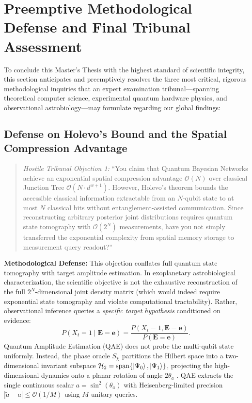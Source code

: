 \section{Preemptive Methodological Defense and Final Tribunal Assessment}\label{sec:preemptive_defense_ch5}

To conclude this Master's Thesis with the highest standard of scientific integrity, this section anticipates and preemptively resolves the three most critical, rigorous methodological inquiries that an expert examination tribunal—spanning theoretical computer science, experimental quantum hardware physics, and observational astrobiology—may formulate regarding our global findings:

\subsection{Defense on Holevo's Bound and the Spatial Compression Advantage}
\begin{quote}
\emph{Hostile Tribunal Objection 1:} ``You claim that Quantum Bayesian Networks achieve an exponential spatial compression advantage $\mathcal{O}(N)$ over classical Junction Tree $\mathcal{O}(N \cdot d^{w+1})$. However, Holevo's theorem bounds the accessible classical information extractable from an $N$-qubit state to at most $N$ classical bits without entanglement-assisted communication. Since reconstructing arbitrary posterior joint distributions requires quantum state tomography with $\mathcal{O}(2^N)$ measurements, have you not simply transferred the exponential complexity from spatial memory storage to measurement query readout?''
\end{quote}
\textbf{Methodological Defense:} This objection conflates full quantum state tomography with target amplitude estimation. In exoplanetary astrobiological characterization, the scientific objective is not the exhaustive reconstruction of the full $2^N$-dimensional joint density matrix (which would indeed require exponential state tomography and violate computational tractability). Rather, observational inference queries a \emph{specific target hypothesis} conditioned on evidence:
\begin{equation}
P(X_t = 1 \mid \mathbf{E} = \mathbf{e}) = \frac{P(X_t = 1, \mathbf{E} = \mathbf{e})}{P(\mathbf{E} = \mathbf{e})}.
\end{equation}
Quantum Amplitude Estimation (QAE) does not probe the multi-qubit state uniformly. Instead, the phase oracle $S_\chi$ partitions the Hilbert space into a two-dimensional invariant subspace $\mathcal{H}_2 = \mathrm{span}\{\left|\Psi_0\right\rangle, \left|\Psi_1\right\rangle\}$, projecting the high-dimensional dynamics onto a planar rotation of angle $2\theta_a$ \cite{brassard2002}. QAE extracts the single continuous scalar $a = \sin^2(\theta_a)$ with Heisenberg-limited precision $|\tilde{a} - a| \le \mathcal{O}(1/M)$ using $M$ unitary queries. 

